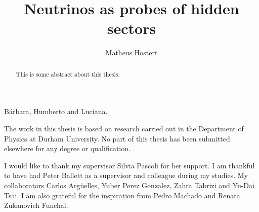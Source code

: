 \documentclass[openany,twoside,frontopenright]{ip3thesis}
\begin{document}
\title{Neutrinos as probes of hidden sectors}
\subtitle{}
\author{Matheus Hostert}
\maketitlepage*

\begin{abstract}
%
	This is some abstract about this thesis.
%
\end{abstract}


\begin{dedication*}
%
B\'arbara, Humberto and Luciana.
%
\end{dedication*}

\disableprotrusion
\tableofcontents*
\listoffigures
\listoftables
\enableprotrusion

\begin{declaration*}
%
	The work in this thesis is based on research carried out in the Department of
	Physics at Durham University. No part of this thesis has been
	submitted elsewhere for any degree or qualification.
%
\end{declaration*}

\begin{acknowledgements*}
%
	I would like to thank my supervisor Silvia Pascoli for her support. I am thankful to have had Peter Ballett as a supervisor and colleague during my studies.
	My collaborators Carlos Arg\"uelles, Yuber Perez Gonzalez, Zahra Tabrizi and Yu-Dai Tsai. I am also grateful for the inspiration from  Pedro Machado and Renata Zukanovich Funchal.
\end{acknowledgements*}



\cleardoublepage
\end{document}

